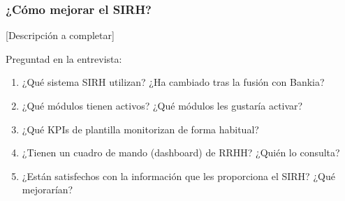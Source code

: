 \subsubsection{¿Cómo mejorar el SIRH?}


[Descripción a completar]

\begin{notaequipo}
  Preguntad en la entrevista:
  \begin{enumerate}
    \item ¿Qué sistema SIRH utilizan? ¿Ha cambiado tras la fusión con Bankia?
    \item ¿Qué módulos tienen activos? ¿Qué módulos les gustaría activar?
    \item ¿Qué KPIs de plantilla monitorizan de forma habitual?
    \item ¿Tienen un cuadro de mando (dashboard) de RRHH? ¿Quién lo consulta?
    \item ¿Están satisfechos con la información que les proporciona el SIRH?
          ¿Qué mejorarían?
  \end{enumerate}
\end{notaequipo}
